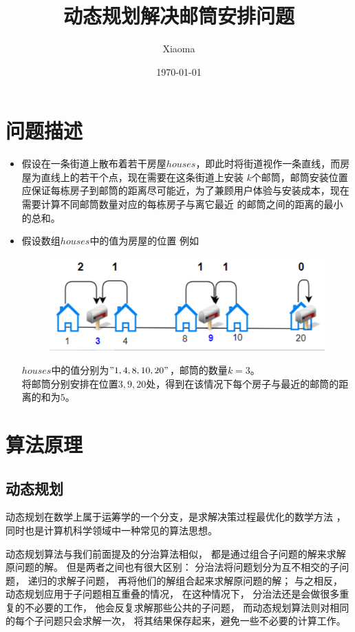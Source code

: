 \documentclass[12pt, a4paper, oneside]{ctexart}
\title{动态规划解决邮筒安排问题}
\author{Xiaoma}
\date{\today}
\begin{document}
\maketitle
\section{问题描述}
\begin{itemize}
    \item 假设在一条街道上散布着若干房屋$houses$，即此时将街道视作一条直线，而房屋为直线上的若干个点，现在需要在这条街道上安装
    $k$个邮筒，邮筒安装位置应保证每栋房子到邮筒的距离尽可能近，为了兼顾用户体验与安装成本，现在需要计算不同邮筒数量对应的每栋房子与离它最近
    的邮筒之间的距离的最小的总和。
    \item 假设数组$houses$中的值为房屋的位置
    例如
    \begin{figure}[H]
        \centering
        \includegraphics[scale=0.6]{1.png}
    \end{figure}
    $houses$中的值分别为$"1, 4, 8, 10, 20"$，邮筒的数量$k = 3$。\\
    将邮筒分别安排在位置$3,9,20$处，得到在该情况下每个房子与最近的邮筒的距离的和为$5$。
\end{itemize}
\section{算法原理}
\subsection{动态规划}
动态规划在数学上属于运筹学的一个分支，是求解决策过程最优化的数学方法
，同时也是计算机科学领域中一种常见的算法思想。

动态规划算法与我们前面提及的分治算法相似，
都是通过组合子问题的解来求解原问题的解。
但是两者之间也有很大区别：
分治法将问题划分为互不相交的子问题，
递归的求解子问题，
再将他们的解组合起来求解原问题的解；
与之相反，
动态规划应用于子问题相互重叠的情况，
在这种情况下，
分治法还是会做很多重复的不必要的工作，
他会反复求解那些公共的子问题，
而动态规划算法则对相同的每个子问题只会求解一次，
将其结果保存起来，避免一些不必要的计算工作。
\end{document}
